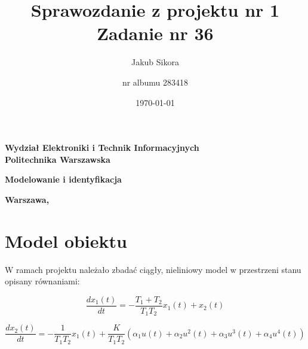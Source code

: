 \documentclass[a4paper,titlepage,11pt,floatssmall]{mwrep}
\title{\bf Sprawozdanie z projektu nr 1\\ Zadanie nr 36  \vskip 0.1cm}
\author{Jakub Sikora \and nr albumu 283418}
\date{\today}
\begin{document}
\makeatletter
\renewcommand{\maketitle}{\begin{titlepage}
		\begin{center}{\LARGE {\bf
					Wydział Elektroniki i Technik Informacyjnych}}\\
			\vspace{0.4cm}
			{\LARGE {\bf Politechnika Warszawska}}\\
			\vspace{0.3cm}
		\end{center}
		\vspace{5cm}
		\begin{center}
			{\bf \LARGE Modelowanie i identyfikacja \vskip 0.1cm}
		\end{center}
		\vspace{1cm}
		\begin{center}
			{\bf \LARGE \@title}
		\end{center}
		\vspace{2cm}
		\begin{center}
			{\bf \Large \@author \par}
		\end{center}
		\vspace*{\stretch{6}}
		\begin{center}
			\bf{\large{Warszawa, \@date\vskip 0.1cm}}
		\end{center}
	\end{titlepage}
	}
\makeatother
\maketitle

\tableofcontents


\chapter{Model obiektu}
\indent{} W ramach projektu należało zbadać ciągły, nieliniowy model w przestrzeni stanu opisany równaniami:

\begin{equation*}
\frac{dx_1(t)}{dt} = - \frac{T_1 + T_2}{T_1 T_2} x_1(t) + x_2(t) 
\end{equation*}

\begin{equation*}
\frac{dx_2(t)}{dt} = - \frac{1}{T_1 T_2} x_1(t) + \frac{K}{T_1 T_2}(\alpha_1 u(t) + \alpha_2 u^2(t) + \alpha_3 u^3(t) + \alpha_4 u^4(t)) 
\end{equation*}
\end{document}
